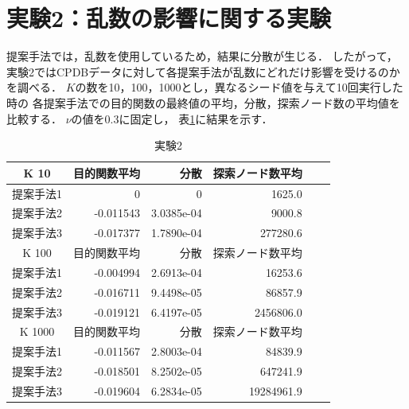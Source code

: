 \section{実験2：乱数の影響に関する実験}
提案手法では，乱数を使用しているため，結果に分散が生じる．
したがって，実験2ではCPDBデータに対して各提案手法が乱数にどれだけ影響を受けるのかを調べる．
$K$の数を10，100，1000とし，異なるシード値を与えて10回実行した時の
各提案手法での目的関数の最終値の平均，分散，探索ノード数の平均値を比較する．
$\nu$の値を0.3に固定し，
表\ref{randomseed}に結果を示す．
\begin{table}[t]
	\centering
	\begin{tabular}{|c|r|r|r|r|r|}
		\hline
		K 10 & 目的関数平均 & 分散 & 探索ノード数平均 \\
		\hline \hline
		提案手法1  & 0 & 0 & 1625.0 \\
		\hline
		提案手法2  & -0.011543 & 3.0385e-04 & 9000.8 \\
		\hline
		提案手法3  & -0.017377 & 1.7890e-04 & 277280.6 \\
		\hline
		\hline
		K 100 & 目的関数平均 & 分散 & 探索ノード数平均 \\
		\hline \hline
		提案手法1  & -0.004994 & 2.6913e-04 & 16253.6 \\
		\hline
		提案手法2  & -0.016711 & 9.4498e-05 & 86857.9 \\
		\hline
		提案手法3  & -0.019121 & 6.4197e-05 & 2456806.0 \\
		\hline
		\hline
		K 1000 & 目的関数平均 & 分散 & 探索ノード数平均 \\
		\hline \hline
		提案手法1  & -0.011567 & 2.8003e-04 & 84839.9 \\
		\hline
		提案手法2  & -0.018501 & 8.2502e-05 & 647241.9 \\
		\hline
		提案手法3  & -0.019604 & 6.2834e-05 & 19284961.9 \\
		\hline
	\end{tabular}
	\caption{実験2}
	\label{randomseed}
\end{table}

